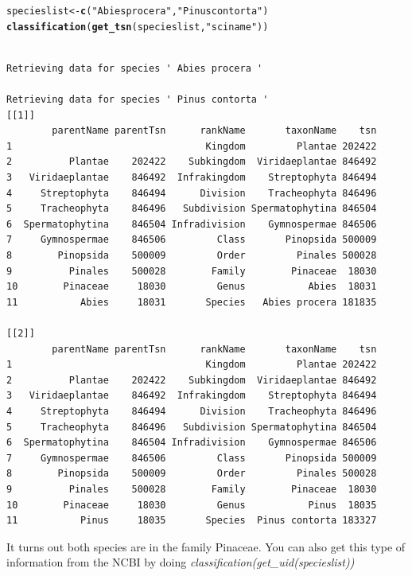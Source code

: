 \documentclass[letterpaper,superscriptaddress,showkeys,longbibliography]{revtex4-1}\usepackage{graphicx, color}
\makeatletter
\newcommand{\hlfunctioncall}[1]{\textcolor[rgb]{0.501960784313725,0,0.329411764705882}{\textbf{#1}}}%
\newcommand{\hlstring}[1]{\textcolor[rgb]{0.6,0.6,1}{#1}}%
\newenvironment{kframe}{%
 \def\at@end@of@kframe{}%
 \ifinner\ifhmode%
  \def\at@end@of@kframe{\end{minipage}}%
  \begin{minipage}{\columnwidth}%
 \fi\fi%
 \def\FrameCommand##1{\hskip\@totalleftmargin \hskip-\fboxsep
 \colorbox{shadecolor}{##1}\hskip-\fboxsep
     \hskip-\linewidth \hskip-\@totalleftmargin \hskip\columnwidth}%
 \MakeFramed {\advance\hsize-\width
   \@totalleftmargin\z@ \linewidth\hsize
   \@setminipage}}%
 {\par\unskip\endMakeFramed%
 \at@end@of@kframe}
\newenvironment{knitrout}{}{} %
\makeatother
\begin{document}
\begin{knitrout}
\color{fgcolor}\begin{kframe}
\begin{alltt}
specieslist <- \hlfunctioncall{c}(\hlstring{"Abies procera"}, \hlstring{"Pinus contorta"})
\hlfunctioncall{classification}(\hlfunctioncall{get_tsn}(specieslist, \hlstring{"sciname"}))
\end{alltt}
\begin{verbatim}

Retrieving data for species ' Abies procera '

Retrieving data for species ' Pinus contorta '
[[1]]
        parentName parentTsn      rankName       taxonName    tsn
1                                  Kingdom         Plantae 202422
2          Plantae    202422    Subkingdom  Viridaeplantae 846492
3   Viridaeplantae    846492  Infrakingdom    Streptophyta 846494
4     Streptophyta    846494      Division    Tracheophyta 846496
5     Tracheophyta    846496   Subdivision Spermatophytina 846504
6  Spermatophytina    846504 Infradivision    Gymnospermae 846506
7     Gymnospermae    846506         Class       Pinopsida 500009
8        Pinopsida    500009         Order         Pinales 500028
9          Pinales    500028        Family        Pinaceae  18030
10        Pinaceae     18030         Genus           Abies  18031
11           Abies     18031       Species   Abies procera 181835

[[2]]
        parentName parentTsn      rankName       taxonName    tsn
1                                  Kingdom         Plantae 202422
2          Plantae    202422    Subkingdom  Viridaeplantae 846492
3   Viridaeplantae    846492  Infrakingdom    Streptophyta 846494
4     Streptophyta    846494      Division    Tracheophyta 846496
5     Tracheophyta    846496   Subdivision Spermatophytina 846504
6  Spermatophytina    846504 Infradivision    Gymnospermae 846506
7     Gymnospermae    846506         Class       Pinopsida 500009
8        Pinopsida    500009         Order         Pinales 500028
9          Pinales    500028        Family        Pinaceae  18030
10        Pinaceae     18030         Genus           Pinus  18035
11           Pinus     18035       Species  Pinus contorta 183327
\end{verbatim}
\end{kframe}
\end{knitrout}


It turns out both species are in the family Pinaceae. You can also get this type of information from the NCBI by doing \emph{classification(get\_uid(specieslist))}
\end{document}
